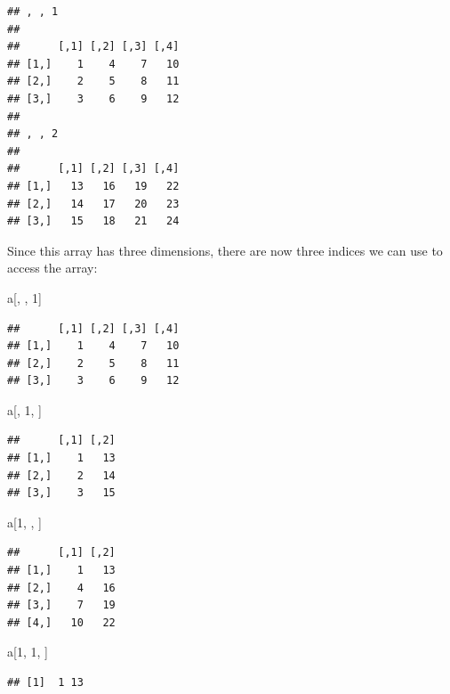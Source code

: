 \documentclass[]{article}
\newenvironment{Shaded}{\begin{snugshade}}{\end{snugshade}}
\newcommand{\DecValTok}[1]{\textcolor[rgb]{0.00,0.00,0.81}{#1}}
\newcommand{\NormalTok}[1]{#1}
\begin{document}
\begin{verbatim}
## , , 1
## 
##      [,1] [,2] [,3] [,4]
## [1,]    1    4    7   10
## [2,]    2    5    8   11
## [3,]    3    6    9   12
## 
## , , 2
## 
##      [,1] [,2] [,3] [,4]
## [1,]   13   16   19   22
## [2,]   14   17   20   23
## [3,]   15   18   21   24
\end{verbatim}

Since this array has three dimensions, there are now three indices we
can use to access the array:

\begin{Shaded}
\begin{Highlighting}[]
\NormalTok{a[, , }\DecValTok{1}\NormalTok{]}
\end{Highlighting}
\end{Shaded}

\begin{verbatim}
##      [,1] [,2] [,3] [,4]
## [1,]    1    4    7   10
## [2,]    2    5    8   11
## [3,]    3    6    9   12
\end{verbatim}

\begin{Shaded}
\begin{Highlighting}[]
\NormalTok{a[, }\DecValTok{1}\NormalTok{, ]}
\end{Highlighting}
\end{Shaded}

\begin{verbatim}
##      [,1] [,2]
## [1,]    1   13
## [2,]    2   14
## [3,]    3   15
\end{verbatim}

\begin{Shaded}
\begin{Highlighting}[]
\NormalTok{a[}\DecValTok{1}\NormalTok{, , ]}
\end{Highlighting}
\end{Shaded}

\begin{verbatim}
##      [,1] [,2]
## [1,]    1   13
## [2,]    4   16
## [3,]    7   19
## [4,]   10   22
\end{verbatim}

\begin{Shaded}
\begin{Highlighting}[]
\NormalTok{a[}\DecValTok{1}\NormalTok{, }\DecValTok{1}\NormalTok{, ]}
\end{Highlighting}
\end{Shaded}

\begin{verbatim}
## [1]  1 13
\end{verbatim}
\end{document}
